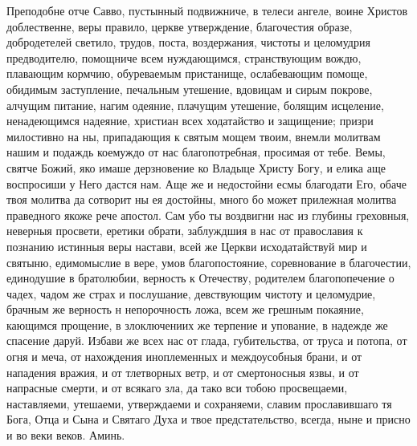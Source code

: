 \begin{mymulticols}
Преподобне отче Савво, пустынный подвижниче, в телеси ангеле, воине Христов доблественне, веры правило, церкве утверждение, благочестия образе, добродетелей светило, трудов, поста, воздержания, чистоты и целомудрия предводителю, помощниче всем нуждающимся, странствующим вождю, плавающим кормчию, обуреваемым пристанище, ослабевающим помоще, обидимым заступление, печальным утешение, вдовицам и сирым покрове, алчущим питание, нагим одеяние, плачущим утешение, болящим исцеление, ненадеющимся надеяние, христиан всех ходатайство и защищение; призри милостивно на ны, припадающия к святым мощем твоим, внемли молитвам нашим и подаждь коемуждо от нас благопотребная, просимая от тебе. Вемы, святче Божий, яко имаше дерзновение ко Владыце Христу Богу, и елика аще воспросиши у Него дастся нам. Аще же и недостойни есмы благодати Его, обаче твоя молитва да сотворит ны ея достойны, много бо может прилежная молитва праведного якоже рече апостол. Сам убо ты воздвигни нас из глубины греховныя, неверныя просвети, еретики обрати, заблуждшия в нас от православия к познанию истинныя веры настави, всей же Церкви исходатайствуй мир и святыню, едимомыслие в вере, умов благопостояние, соревнование в благочестии, единодушие в братолюбии, верность к Отечеству, родителем благопопечение о чадех, чадом же страх и послушание, девствующим чистоту и целомудрие, брачным же верность н непорочность ложа, всем же грешным покаяние, кающимся прощение, в злоключениих же терпение и упование, в надежде же спасение даруй. Избави же всех нас от глада, губительства, от труса и потопа, от огня и меча, от нахождения иноплеменных и междоусобныя брани, и от нападения вражия, и от тлетворных ветр, и от смертоносныя язвы, и от напрасные смерти, и от всякаго зла, да тако вси тобою просвещаеми, наставляеми, утешаеми, утверждаеми и сохраняеми, славим прославившаго тя Бога, Отца и Сына и Святаго Духа и твое предстательство, всегда, ныне и присно и во веки веков. Аминь.

\end{mymulticols}

